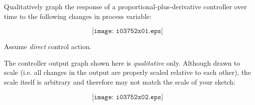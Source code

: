 

Qualitatively graph the response of a proportional-plus-derivative controller over time to the following changes in process variable:

$$\texttt{[image: i03752x01.eps]}$$

Assume {\it direct} control action.
 






The controller output graph shown here is {\it qualitative} only.  Although drawn to scale (i.e. all changes in the output are properly scaled relative to each other), the scale itself is arbitrary and therefore may not match the scale of your sketch:

$$\texttt{[image: i03752x02.eps]}$$











